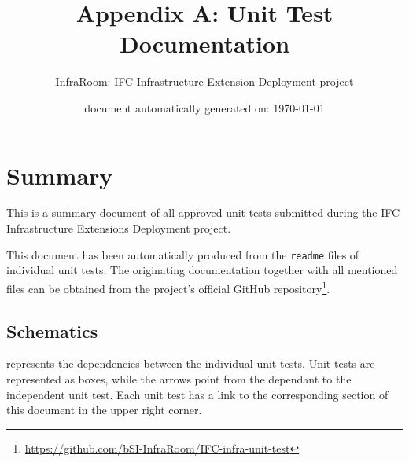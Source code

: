 \documentclass{scrartcl}
\title{Appendix A: Unit Test Documentation}
\author{InfraRoom: IFC Infrastructure Extension Deployment project}
\date{document automatically generated on: \today}
\begin{document}
\maketitle

\section{Summary}
\label{sec:summary}

This is a summary document of all approved unit tests submitted during the IFC Infrastructure Extensions Deployment project.

This document has been automatically produced from the \texttt{readme} files of individual unit tests.
The originating documentation together with all mentioned files can be obtained
 from the project's official GitHub repository\footnote{\url{https://github.com/bSI-InfraRoom/IFC-infra-unit-test}}.

\subsection{Schematics}
\label{sec:schematics}

 represents the dependencies between the individual unit tests.
Unit tests are represented as boxes, while the arrows point from the dependant to the independent unit test.
Each unit test has a link to the corresponding section of this document in the upper right corner.
\end{document}
